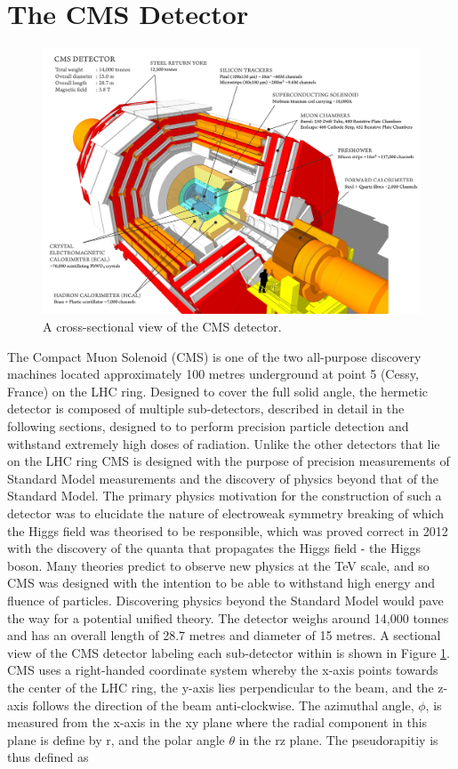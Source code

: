 \newpage

\section{The CMS Detector} \label{sec-TheCMSDetector}

\begin{figure} [h!] 
\includegraphics[width=\textwidth]{Figures/CMSDetector.png}
\caption{A cross-sectional view of the CMS detector.}
\label{fig-CMSDetector}
\end{figure}

The Compact Muon Solenoid (CMS) \cite{CMSexperiment} is one of the two all-purpose discovery machines located approximately 100 metres underground at point 5 (Cessy, France) on the LHC ring. Designed to cover the full solid angle, the hermetic detector is composed of multiple sub-detectors, described in detail in the following sections, designed to to perform precision particle detection and withstand extremely high doses of radiation. Unlike the other detectors that lie on the LHC ring CMS is designed with the purpose of precision measurements of Standard Model measurements and the discovery of physics beyond that of the Standard Model. The primary physics motivation for the construction of such a detector was to elucidate the nature of electroweak symmetry breaking of which the Higgs field was theorised to be responsible, which was proved correct in 2012 with the discovery of the quanta that propagates the Higgs field - the Higgs boson. Many theories predict to observe new physics at the TeV scale, and so CMS was designed with the intention to be able to withstand high energy and fluence of particles. Discovering physics beyond the Standard Model would pave the way for a potential unified theory. The detector weighs around 14,000 tonnes and has an overall length of 28.7 metres and diameter of 15 metres. A sectional view of the CMS detector labeling each sub-detector within is shown in Figure \ref{fig-CMSDetector}. CMS uses a right-handed coordinate system whereby the x-axis points towards the center of the LHC ring, the y-axis lies perpendicular to the beam, and the z-axis follows the direction of the beam anti-clockwise. The azimuthal angle, $\phi$, is measured from the x-axis in the xy plane where the radial component in this plane is define by r, and the polar angle $\theta$ in the rz plane. The pseudorapitiy is thus defined as 

